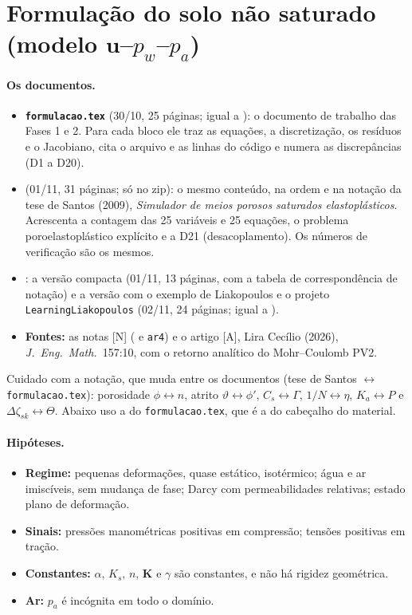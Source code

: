 \section{Formulação do solo não saturado (modelo \texorpdfstring{$\bm u$--$p_w$--$p_a$}{u-pw-pa})}
\label{sec:formulacao}

\paragraph{Os documentos.}
\begin{itemize}
  \item \textbf{\texttt{formulacao.tex}} (30/10, 25 páginas; igual a ): o
    documento de trabalho das Fases 1 e 2. Para cada bloco ele traz as equações, a discretização, os resíduos e o
    Jacobiano, cita o arquivo e as linhas do código e numera as discrepâncias (D1 a D20).
  \item \textbf{} (01/11, 31 páginas; só no zip): o mesmo conteúdo, na ordem e na notação
    da tese de Santos (2009), \emph{Simulador de meios porosos saturados elastoplásticos}. Acrescenta a contagem das
    25 variáveis e 25 equações, o problema poroelastoplástico explícito e a D21 (desacoplamento). Os números de
    verificação são os mesmos.
  \item \textbf{}: a versão compacta (01/11, 13 páginas, com a tabela de
    correspondência de notação) e a versão com o exemplo de Liakopoulos e o projeto \texttt{LearningLiakopoulos}
    (02/11, 24 páginas; igual a ).
  \item \textbf{Fontes:} as notas [N] ( e \texttt{ar4}) e o artigo [A], Lira
    Cecílio (2026), \emph{J.\ Eng.\ Math.}\ 157:10, com o retorno analítico do Mohr--Coulomb PV2.
\end{itemize}
Cuidado com a notação, que muda entre os documentos (tese de Santos $\leftrightarrow$ \texttt{formulacao.tex}):
porosidade $\phi \leftrightarrow n$, atrito $\vartheta \leftrightarrow \phi'$, $C_s \leftrightarrow \Gamma$,
$1/N \leftrightarrow \eta$, $K_a \leftrightarrow P$ e $\Delta\zeta_{sk} \leftrightarrow \Theta$. Abaixo uso a do
\texttt{formulacao.tex}, que é a do cabeçalho do material.

\paragraph{Hipóteses.}
\begin{itemize}
  \item \textbf{Regime:} pequenas deformações, quase estático, isotérmico; água e ar imiscíveis, sem mudança de fase;
    Darcy com permeabilidades relativas; estado plano de deformação.
  \item \textbf{Sinais:} pressões manométricas positivas em compressão; tensões positivas em tração.
  \item \textbf{Constantes:} $\alpha$, $K_s$, $n$, $\bm K$ e $\gamma$ são constantes, e não há rigidez geométrica.
  \item \textbf{Ar:} $p_a$ é incógnita em todo o domínio.
\end{itemize}

